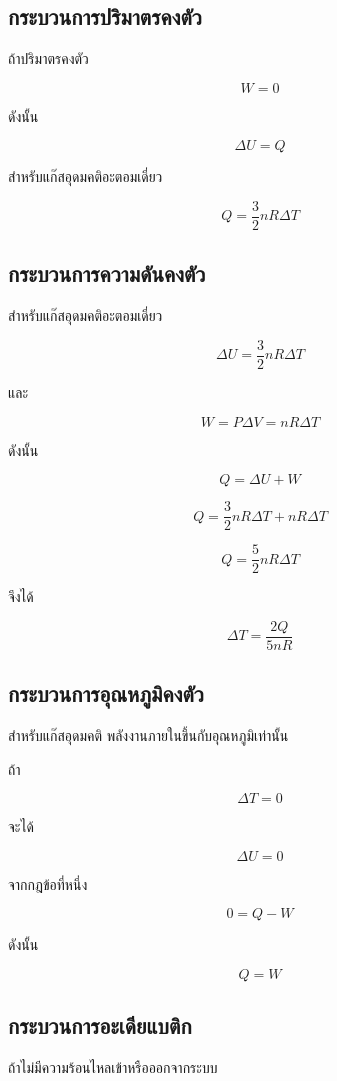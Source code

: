 \subsection{กระบวนการปริมาตรคงตัว}

ถ้าปริมาตรคงตัว

\[
W=0
\]

ดังนั้น

\[
\boxed{
\Delta U=Q
}
\]

สำหรับแก๊สอุดมคติอะตอมเดี่ยว

\[
\boxed{
Q
=
\frac{3}{2}nR\Delta T
}
\]

\subsection{กระบวนการความดันคงตัว}

สำหรับแก๊สอุดมคติอะตอมเดี่ยว

\[
\Delta U
=
\frac{3}{2}nR\Delta T
\]

และ

\[
W
=
P\Delta V
=
nR\Delta T
\]

ดังนั้น

\[
Q
=
\Delta U+W
\]

\[
Q
=
\frac{3}{2}nR\Delta T+nR\Delta T
\]

\[
\boxed{
Q
=
\frac{5}{2}nR\Delta T
}
\]

จึงได้

\[
\boxed{
\Delta T
=
\frac{2Q}{5nR}
}
\]

\subsection{กระบวนการอุณหภูมิคงตัว}

สำหรับแก๊สอุดมคติ พลังงานภายในขึ้นกับอุณหภูมิเท่านั้น

ถ้า

\[
\Delta T=0
\]

จะได้

\[
\Delta U=0
\]

จากกฎข้อที่หนึ่ง

\[
0=Q-W
\]

ดังนั้น

\[
\boxed{Q=W}
\]

\subsection{กระบวนการอะเดียแบติก}

ถ้าไม่มีความร้อนไหลเข้าหรือออกจากระบบ

